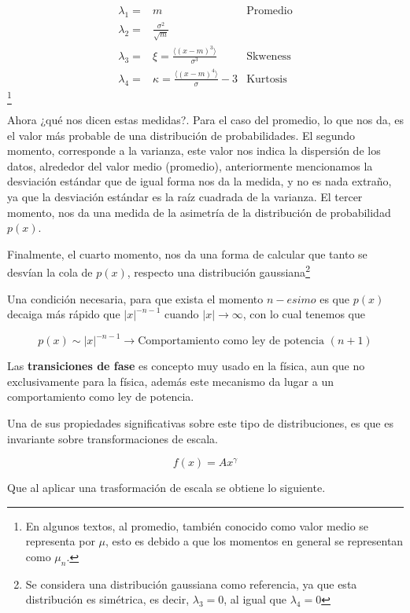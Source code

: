 \begin{align}
	\lambda_1 =& m & \text{Promedio}\\
	\lambda_2 =& \frac{\sigma^2}{\sqrt{m}} & \\
	\lambda_3 =& \xi = \frac{\langle(x-m)^3\rangle}{\sigma^3} & \text{Skweness}\\
	\lambda_4 =& \kappa = \frac{\langle (x-m)^4\rangle}{\sigma} - 3 & \text{Kurtosis}
\end{align}\footnote{En algunos textos, al promedio, también conocido como valor medio se representa por $\mu$, esto es debido a que los momentos en general se representan como $\mu_n$.}

Ahora ¿qué nos dicen estas medidas?.
Para el caso del promedio, lo que nos da, es el valor más probable de una distribución de probabilidades.
El segundo momento, corresponde a la varianza, este valor nos indica la dispersión de los datos, alrededor del valor medio (promedio), anteriormente mencionamos la desviación estándar que de igual forma nos da la medida, y no es nada extraño, ya que la desviación estándar es la raíz cuadrada de la varianza.
El tercer momento, nos da una medida de la asimetría de la distribución de probabilidad $p(x)$.

Finalmente, el cuarto momento, nos da una forma de calcular que tanto se desvían la cola de $p(x)$, respecto una distribución gaussiana\footnote{Se considera una distribución gaussiana como referencia, ya que esta distribución es simétrica, es decir, $\lambda_3 = 0$, al igual que $\lambda_4 = 0$}

Una condición necesaria, para que exista el momento $n-esimo$ es que $p(x)$ decaiga más rápido que $|x|^{-n-1}$ cuando $|x| \to \infty$, con lo cual tenemos que

$$p(x) \sim |x|^{-n-1}\rightarrow \text{Comportamiento como ley de potencia } (n+1)$$

Las \textbf{transiciones de fase} es concepto muy usado en la física, aun que no exclusivamente para la física, además este mecanismo da lugar a un comportamiento como ley de potencia.

Una de sus propiedades significativas sobre este tipo de distribuciones, es que es invariante sobre transformaciones de escala.

\begin{equation}
	f(x) = Ax^\gamma
\end{equation}

Que al aplicar una trasformación de escala se obtiene lo siguiente.

